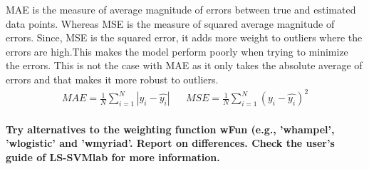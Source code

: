 MAE is the measure of average magnitude of errors between true and estimated data points. Whereas MSE is the measure of squared average magnitude of errors. Since, MSE is the squared error, it adds more weight to outliers where the errors are high.This makes the model perform poorly when trying to minimize the errors. This is not the case with MAE as it only takes the absolute average of errors and that makes it more robust to outliers.
\begin{align*}
MAE = \frac{1}{N} \sum_{i=1}^{N} |y_i - \hat{y_i}| && MSE = \frac{1}{N} \sum_{i=1}^{N} (y_i - \hat{y_i})^2 \label{eq:label1}
\end{align*}\\
\textbf{Try alternatives to the weighting function wFun (e.g., ’whampel’, ’wlogistic’ and
	’wmyriad’. Report on differences. Check the user’s guide of LS-SVMlab for more
	information.}

